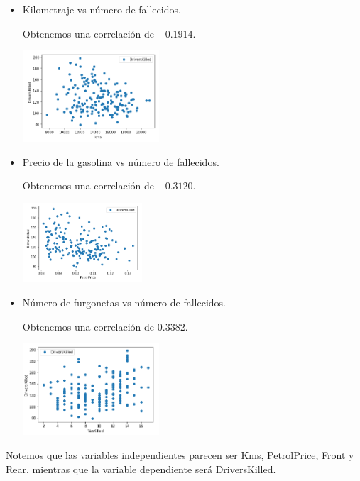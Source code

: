 \documentclass[letterpaper,11pt]{article}
\begin{document}
\begin{enumerate}
\begin{itemize}
        \item Kilometraje vs número de fallecidos.

        Obtenemos una correlación de $-0.1914$.
        \begin{center}
            \includegraphics[width=0.4\textwidth]{imagenes/seat6.png}
        \end{center}

        \item Precio de la gasolina vs número de fallecidos.

        Obtenemos una correlación de $-0.3120$.
        \begin{center}
            \includegraphics[width=0.35\textwidth]{imagenes/seat7.png}
        \end{center}

        \item Número de furgonetas vs número de fallecidos.

        Obtenemos una correlación de $0.3382$.
        \begin{center}
            \includegraphics[width=0.4\textwidth]{imagenes/seat8.png}
        \end{center}
    \end{itemize}

    Notemos que las variables independientes parecen ser Kms, PetrolPrice, 
    Front y Rear, mientras que la variable dependiente será DriversKilled.


\end{enumerate}
\end{document}
